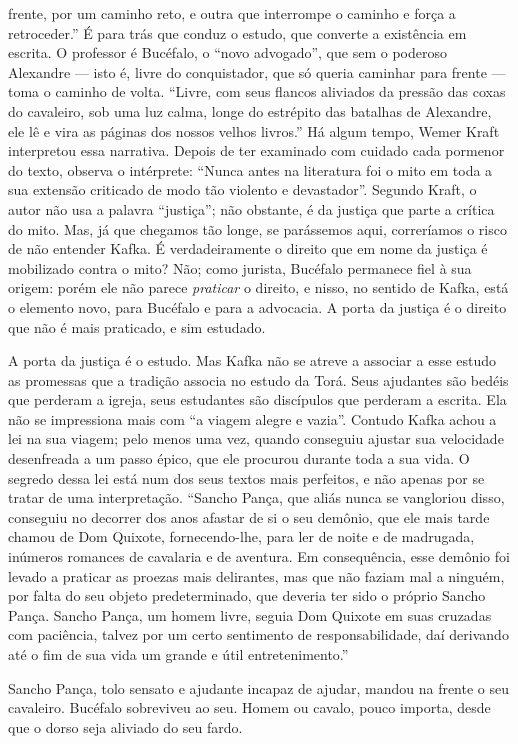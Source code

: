frente, por um caminho reto, e outra que interrompe o caminho e força a
retroceder.'' É para trás que conduz o estudo, que converte a existência
em escrita. O professor é Bucéfalo, o ``novo advogado'', que sem o
poderoso Alexandre --- isto é, livre do conquistador, que só queria
caminhar para frente --- toma o caminho de volta. ``Livre, com seus
flancos aliviados da pressão das coxas do cavaleiro, sob uma luz calma,
longe do estrépito das batalhas de Alexandre, ele lê e vira as páginas
dos nossos velhos livros.'' Há algum tempo, Wemer Kraft interpretou essa
narrativa. Depois de ter examinado com cuidado cada pormenor do texto,
observa o intérprete: ``Nunca antes na literatura foi o mito em toda a
sua extensão criticado de modo tão violento e devastador''. Segundo
Kraft, o autor não usa a palavra ``justiça''; não obstante, é da justiça
que parte a crítica do mito. Mas, já que chegamos tão longe, se
parássemos aqui, correríamos o risco de não entender Kafka. É
verdadeiramente o direito que em nome da justiça é mobilizado contra o
mito? Não; como jurista, Bucéfalo permanece fiel à sua origem: porém ele
não parece \textit{praticar} o direito, e nisso, no sentido de Kafka, está o
elemento novo, para Bucéfalo e para a advocacia. A porta da justiça é o
direito que não é mais praticado, e sim estudado.

A porta da justiça é o estudo. Mas Kafka não se atreve a associar a esse
estudo as promessas que a tradição associa no estudo da Torá. Seus
ajudantes são bedéis que perderam a igreja, seus estudantes são
discípulos que perderam a escrita. Ela não se impressiona mais com ``a
viagem alegre e vazia''. Contudo Kafka achou a lei na sua viagem; pelo
menos uma vez, quando conseguiu ajustar sua velocidade desenfreada a um
passo épico, que ele procurou durante toda a sua vida. O segredo dessa
lei está num dos seus textos mais perfeitos, e não apenas por se tratar
de uma interpretação. ``Sancho Pança, que aliás nunca se vangloriou
disso, conseguiu no decorrer dos anos afastar de si o seu demônio, que
ele mais tarde chamou de Dom Quixote, fornecendo-lhe, para ler de noite
e de madrugada, inúmeros romances de cavalaria e de aventura. Em
consequência, esse demônio foi levado a praticar as proezas mais
delirantes, mas que não faziam mal a ninguém, por falta do seu objeto
predeterminado, que deveria ter sido o próprio Sancho Pança. Sancho
Pança, um homem livre, seguia Dom Quixote em suas cruzadas com
paciência, talvez por um certo sentimento de responsabilidade, daí
derivando até o fim de sua vida um grande e útil entretenimento.''

Sancho Pança, tolo sensato e ajudante incapaz de ajudar, mandou na
frente o seu cavaleiro. Bucéfalo sobreviveu ao seu. Homem ou cavalo,
pouco importa, desde que o dorso seja aliviado do seu fardo.